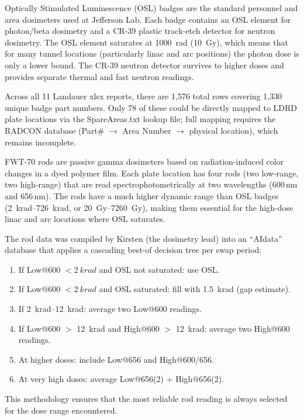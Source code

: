 \documentclass[11pt,letterpaper]{article}
\newcommand{\JLab}{Jefferson Lab}
\begin{document}
\begin{description}[style=nextline]
    \item[OSL Badges (Landauer InLight 2T + CR-39)]
    Optically Stimulated Luminescence (OSL) badges are the standard personnel
    and area dosimeters used at \JLab. Each badge contains an OSL element for
    photon/beta dosimetry and a CR-39 plastic track-etch detector for neutron
    dosimetry. The OSL element saturates at \SI{1000}{rad} (\SI{10}{Gy}),
    which means that for many tunnel locations (particularly linac and arc
    positions) the photon dose is only a lower bound. The CR-39
    neutron detector survives to higher doses and provides separate thermal
    and fast neutron readings.

    Across all 11 Landauer xlsx reports, there are 1,576 total rows covering
    1,330 unique badge part numbers. Only 78 of these could be directly mapped
    to LDRD plate locations via the SpareAreas.txt lookup file; full mapping
    requires the RADCON database (Part\# $\to$ Area Number $\to$ physical
    location), which remains incomplete.

    \item[FWT-70 Optichromic Rods (AIdata)]
    FWT-70 rods are passive gamma dosimeters based on radiation-induced color
    changes in a dyed polymer film. Each plate location has four rods (two
    low-range, two high-range) that are read spectrophotometrically at two
    wavelengths (600\,nm and 656\,nm). The rods have a much higher dynamic
    range than OSL badges (\SIrange{2}{726}{krad}, or \SIrange{20}{7260}{Gy}),
    making them essential for the high-dose linac and arc locations where OSL
    saturates.

    The rod data was compiled by Kirsten (the dosimetry lead) into an ``AIdata''
    database that applies a cascading best-of decision tree per swap period:
    \begin{enumerate}
        \item If Low@600 $< \SI{2}{krad}$ and OSL not saturated: use OSL.
        \item If Low@600 $< \SI{2}{krad}$ and OSL saturated: fill with
        \SI{1.5}{krad} (gap estimate).
        \item If \SIrange{2}{12}{krad}: average two Low@600 readings.
        \item If Low@600 $>$ \SI{12}{krad} and High@600 $>$ \SI{12}{krad}:
        average two High@600 readings.
        \item At higher doses: include Low@656 and High@600/656.
        \item At very high doses: average Low@656(2) + High@656(2).
    \end{enumerate}
    This methodology ensures that the most reliable rod reading is always
    selected for the dose range encountered.


\end{description}
\end{document}
